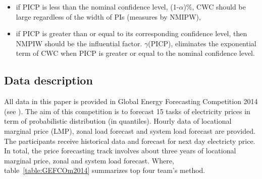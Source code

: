 \documentclass[review]{elsarticle}
\begin{document}
    \begin{itemize}
      \item if PICP is less than the nominal confidence level, (1-$\alpha$)$\%$, CWC should be large regardless of the width of PIs (measures by NMIPW),
      \item if PICP is greater than or equal to its corresponding confidence level, then NMPIW should be the influential factor. $\gamma$(PICP), eliminates the exponential term of CWC when PICP is greater or equal to the nominal confidence level.
    \end{itemize}

  \subsection{Data description}
    All data in this paper is provided in Global Energy Forecasting Competition 2014 (see \cite{Hong2016}). The aim of this competition is to forecast 15 tasks of electricity prices in term of probabilistic distribution (in quantiles). Hourly data of locational marginal price (LMP), zonal load forecast and system load forecast are provided. The participants receive historical data and forecast for next day electricty price. In total, the price forecasting track involves about three years of locational marginal price, zonal and system load forecast. Where, table~\ref{table:GEFCOm2014} summarizes top four team's method.
\end{document}
